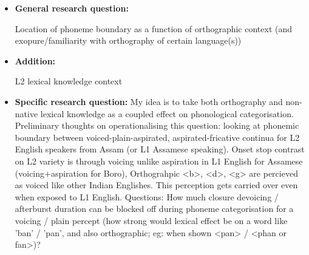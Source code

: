 \documentclass[12pt, english]{article}
\begin{document}
\begin{itemize}
    \item \textbf{General research question:} \par
    Location of phoneme boundary as a function of orthographic context (and exopure/familiarity with orthography of certain language(s))
    \item \textbf{Addition:} \par
    L2 lexical knowledge context
    \item \textbf{Specific research question:}
    My idea is to take both orthography and non-native lexical knowledge as a coupled effect on phonological categorisation. Preliminary thoughts on operationalising this question: looking at phonemic boundary between voiced-plain-aspirated, aspirated-fricative continua for L2 English speakers from Assam (or L1 Assamese speaking). Onset stop contrast on L2 variety is through voicing unlike aspiration in L1 English for Assamese (voicing+aspiration for Boro), Orthograhpic <b>, <d>, <g> are percieved as voiced like other Indian Englishes. This perception gets carried over even when exposed to L1 English. Questions: How much closure devoicing / afterburst duration can be blocked off during phoneme categorisation for a voicing / plain percept (how strong would lexical effect be on a word like 'ban' / 'pan', and also orthographic; eg: when shown <pan> / <phan or fan>)? 
\end{itemize}

\end{document}
